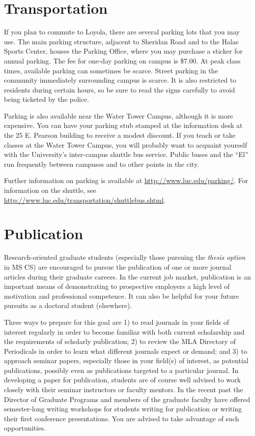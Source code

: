 \documentclass[letterpaper,10pt,english]{sphinxmanual}
\begin{document}
\section{Transportation}
\label{general:transportation}
If you plan to commute to Loyola, there are several parking lots that you may use. The main parking structure, adjacent to Sheridan Road and to the Halas Sports Center, houses the Parking Office, where you may purchase a sticker for annual parking. The fee for one-day parking on campus is \$7.00. At peak class times, available parking can sometimes be scarce. Street parking in the community immediately surrounding campus is scarce. It is also restricted to residents during certain hours, so be sure to read the signs carefully to avoid being ticketed by the police.

Parking is also available near the Water Tower Campus, although it is more expensive. You can have your parking stub stamped at the information desk at the 25 E. Pearson building to receive a modest discount. If you teach or take classes at the Water Tower Campus, you will probably want to acquaint yourself with the University’s inter-campus shuttle bus service. Public buses and the “El” run frequently between campuses and to other points in the city.

Further information on parking is available at \href{http://www.luc.edu/parking/}{http://www.luc.edu/parking/}.
For information on the shuttle, see \href{http://www.luc.edu/transportation/shuttlebus.shtml}{http://www.luc.edu/transportation/shuttlebus.shtml}.


\section{Publication}
\label{general:publication}
Research-oriented graduate students (especially those pursuing the \emph{thesis option} in MS CS) are encouraged to pursue the publication of one or more journal articles during their graduate careers. In the current job market, publication is an important means of demonstrating to prospective employers a high level of motivation and professional competence. It can also be helpful for your future pursuits as a doctoral student (elsewhere).

Three ways to prepare for this goal are 1) to read journals in your fields of interest regularly in order to become familiar with both current scholarship and the requirements of scholarly publication; 2) to review the MLA Directory of Periodicals in order to learn what different journals expect or demand; and 3) to approach seminar papers, especially those in your field(s) of interest, as potential publications, possibly even as publications targeted to a particular journal. In developing a paper for publication, students are of course well advised to work closely with their seminar instructors or faculty mentors. In the recent past the Director of Graduate Programs and members of the graduate faculty have offered semester-long writing workshops for students writing for publication or writing their first conference presentations. You are advised to take advantage of such opportunities.
\end{document}
